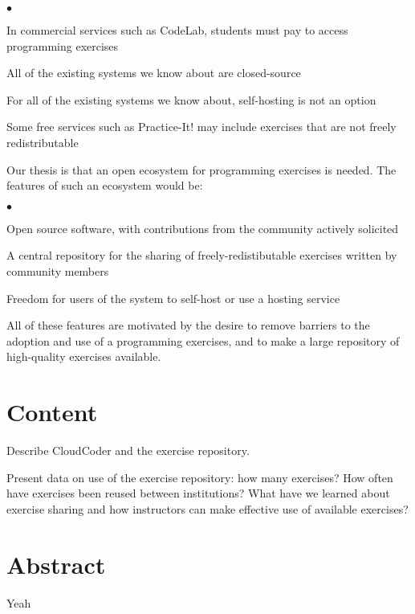 \documentclass[11pt]{article}
\newenvironment{denseItemize}{%
\begin{list}{$\bullet$}{\setlength{\itemsep}{0in}\setlength{\parsep}{.05in}}}{\end{list}}
\begin{document}
\begin{denseItemize}
\item In commercial services such as CodeLab,
      students must pay to access programming exercises
\item All of the existing systems we know about are closed-source
\item For all of the existing systems we know about,
      self-hosting is not an option
\item Some free services such as Practice-It! may include
      exercises that are not freely redistributable
\end{denseItemize}

Our thesis is that an open ecosystem for programming exercises
is needed.  The features of such an ecosystem would be:

\begin{denseItemize}
\item Open source software, with contributions from the community
      actively solicited
\item A central repository for the sharing of freely-redistibutable exercises
      written by community members
\item Freedom for users of the system to self-host or use a hosting service
\end{denseItemize}

All of these features are motivated by the desire to remove 
barriers to the adoption and use of a programming exercises,
and to make a large repository of high-quality exercises available.


\section*{Content}

Describe CloudCoder and the exercise repository.

Present data on use of the exercise repository: how many exercises? How often have exercises
been reused between institutions?  What have we learned about exercise sharing and how
instructors can make effective use of available exercises?

\section*{Abstract}

Yeah
\end{document}
